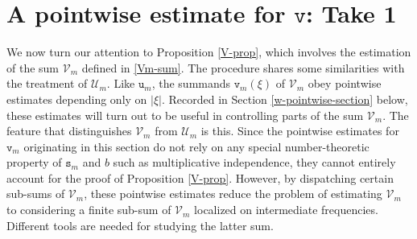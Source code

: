 \documentclass[12pt, twoside]{article}
\theoremstyle{definition}
\numberwithin{equation}{section}
\begin{document}
\section{A pointwise estimate for $\mathtt v$: Take 1} \label{v-pointwise-section} 
We now turn our attention to Proposition \ref{V-prop}, which involves the estimation of the sum $\mathcal V_m$ defined in \eqref{Vm-sum}. The procedure shares some similarities with the treatment of $\mathcal U_m$. Like $\mathtt u_m$, the summands $\mathtt v_m(\xi)$ of $\mathscr{V}_m$ obey pointwise estimates depending only on $|\xi|$. Recorded in Section \ref{w-pointwise-section} below, these estimates will turn out to be useful in controlling parts of the sum $\mathcal{V}_m$. 
\vskip0.1in 
\noindent The feature that distinguishes $\mathcal V_m$ from $\mathcal U_m$ is this.  Since the pointwise estimates for $\mathtt v_m$ originating in this section do not rely on any special number-theoretic property of $\mathtt s_m$ and $b$ such as multiplicative independence, they cannot entirely account for the proof of Proposition \ref{V-prop}. However, by dispatching certain sub-sums of $\mathcal{V}_m$, these pointwise estimates reduce the problem of estimating $\mathcal V_m$ to considering a finite sub-sum of $\mathscr{V}_m$ localized on intermediate frequencies. Different tools are needed for studying the latter sum. 
\end{document}
